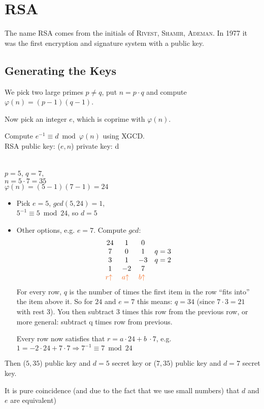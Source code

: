 \chapter{RSA}

The name \textsc{RSA} comes from the initials of \textsc{Rivest}, \textsc{Shamir}, \textsc{Ademan}. In 1977 it was the first encryption and signature system with a public key.

\section{Generating the Keys}

We pick two large primes $p \neq q$, put $n=p \cdot q$ and compute $\varphi(n) = (p-1)(q-1)$.

Now pick an integer $e$, which is coprime with $\varphi(n)$.

Compute $e^{-1} \equiv d \bmod \varphi(n)$ using \textsc{XGCD}. \\

RSA public key: ($e,n$)
private key: d

\begin{example} \ \\
$p = 5$, $q = 7$, \\
$n = 5 \cdot 7 = 35$ \\
$\varphi(n) = (5-1)(7-1)=24$ \\
\begin{itemize}
\item Pick $e=5$, $gcd(5,24) = 1$, \\
$5^{-1} \equiv 5 \bmod 24$, so $d= 5$
\item Other options, e.g. $e = 7$. Compute $gcd$:
\[
\begin{matrix}
24 & 1 &0 & \\
7 & 0 & 1& q=3 \\
3 & 1 & -3 & q=2 \\
1 & -2 & 7& \\
\textcolor{ocre}r\textcolor{ocre}\uparrow \  & \textcolor{ocre}a\textcolor{ocre}\uparrow \  & \textcolor{ocre}b\textcolor{ocre}\uparrow \  & \\
\end{matrix}
\]
For every row, $q$ is the number of times the first item in the row ``fits into'' the item above it. So for $24$ and $e=7$ this means: $q= 34$ (since $7 \cdot 3 = 21$ with rest $3$). You then subtract 3 times this row from the previous row, or more general: subtract q times row from previous.

Every row now satisfies that $r = a \cdot 24 + b\ \cdot 7$, e.g. $1 = -2 \cdot 24 + 7 \cdot 7 \Rightarrow 7^{-1} \equiv 7 \bmod 24$
\end{itemize}
Then ($5,35$) public key and $d=5$ secret key or
($7,35$) public key and $d=7$ secret key.
\begin{remark}
It is pure coincidence (and due to the fact that we use small numbers) that $d$ and $e$ are equivalent)
\end{remark}
\end{example}

